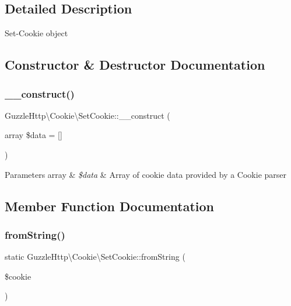 \subsection{Detailed Description}
Set-\/\+Cookie object 

\subsection{Constructor \& Destructor Documentation}
\mbox{\label{classGuzzleHttp_1_1Cookie_1_1SetCookie_a743d69456fd1f19cb52e38d0b8dbfb75}} 
\subsubsection{\texorpdfstring{\+\_\+\+\_\+construct()}{\_\_construct()}}
{\footnotesize\ttfamily Guzzle\+Http\textbackslash{}\+Cookie\textbackslash{}\+Set\+Cookie\+::\+\_\+\+\_\+construct (\begin{DoxyParamCaption}\item[{array}]{\$data = {\ttfamily \mbox{[}\mbox{]}} }\end{DoxyParamCaption})}


\begin{DoxyParams}[1]{Parameters}
array & {\em \$data} & Array of cookie data provided by a Cookie parser \\
\hline
\end{DoxyParams}


\subsection{Member Function Documentation}
\mbox{\label{classGuzzleHttp_1_1Cookie_1_1SetCookie_abeedb44de09de9e5e8324140a626ee79}} 
\subsubsection{\texorpdfstring{from\+String()}{fromString()}}
{\footnotesize\ttfamily static Guzzle\+Http\textbackslash{}\+Cookie\textbackslash{}\+Set\+Cookie\+::from\+String (\begin{DoxyParamCaption}\item[{}]{\$cookie }\end{DoxyParamCaption})\hspace{0.3cm}{\ttfamily [static]}}

